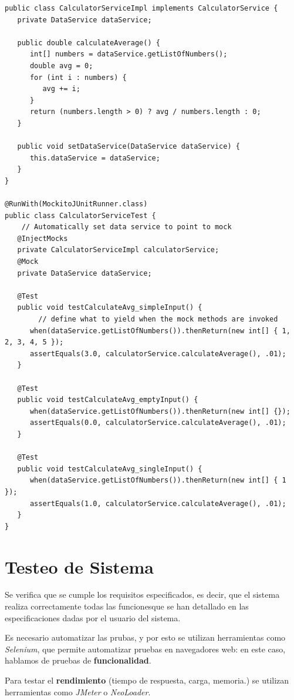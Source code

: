 \begin{lstlisting}
public class CalculatorServiceImpl implements CalculatorService {
   private DataService dataService;

   public double calculateAverage() {
      int[] numbers = dataService.getListOfNumbers();
      double avg = 0;
      for (int i : numbers) {
         avg += i;
      }
      return (numbers.length > 0) ? avg / numbers.length : 0;
   }

   public void setDataService(DataService dataService) {
      this.dataService = dataService;
   }
}

@RunWith(MockitoJUnitRunner.class)
public class CalculatorServiceTest {
	// Automatically set data service to point to mock
   @InjectMocks
   private CalculatorServiceImpl calculatorService;
   @Mock
   private DataService dataService;

   @Test
   public void testCalculateAvg_simpleInput() {
		// define what to yield when the mock methods are invoked
      when(dataService.getListOfNumbers()).thenReturn(new int[] { 1, 2, 3, 4, 5 });
      assertEquals(3.0, calculatorService.calculateAverage(), .01);
   }

   @Test
   public void testCalculateAvg_emptyInput() {
      when(dataService.getListOfNumbers()).thenReturn(new int[] {});
      assertEquals(0.0, calculatorService.calculateAverage(), .01);
   }

   @Test
   public void testCalculateAvg_singleInput() {
      when(dataService.getListOfNumbers()).thenReturn(new int[] { 1 });
      assertEquals(1.0, calculatorService.calculateAverage(), .01);
   }
}
\end{lstlisting}

\section{Testeo de Sistema}
Se verifica que se cumple los requisitos especificados, es decir, que el sistema realiza correctamente todas las funcionesque se han detallado en las especificaciones dadas por el usuario del sistema.

Es necesario automatizar las prubas, y por esto se utilizan herramientas como \textit{Selenium}, que permite automatizar pruebas en navegadores web: en este caso, hablamos de pruebas de \textbf{funcionalidad}.

Para testar el \textbf{rendimiento} (tiempo de respuesta, carga, memoria.) se utilizan herramientas como \textit{JMeter} o \textit{NeoLoader}.

